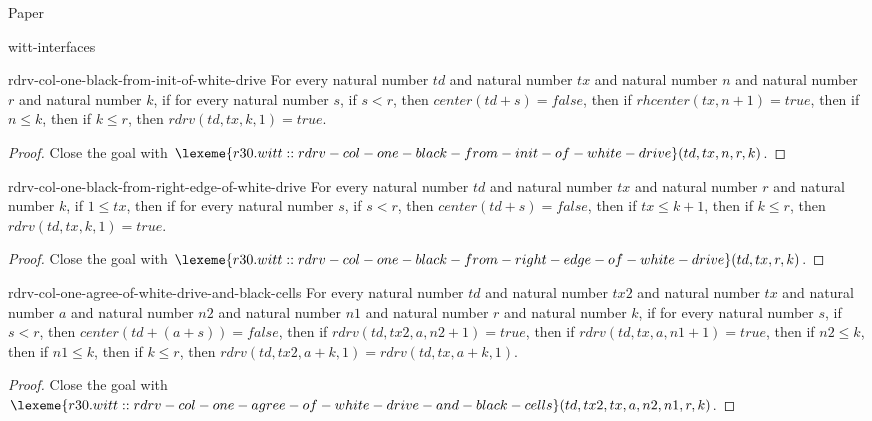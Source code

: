 \begin{lexlean}{Paper}
\begin{section}{witt-interfaces}
  \begin{theorem}{rdrv-col-one-black-from-init-of-white-drive}
  For every natural number \(td\) and natural number \(tx\) and natural number \(n\) and natural number \(r\) and natural number \(k\), if for every natural number \(s\), if \(s < r\), then \(center(td + s) = false\), then if \(rhcenter(tx, n + 1) = true\), then if \(n ≤ k\), then if \(k ≤ r\), then \(rdrv(td, tx, k, 1) = true\).
  \begin{proof}
  Close the goal with \(\lexeme{r30.witt::rdrv-col-one-black-from-init-of-white-drive}(td, tx, n, r, k)\).
  \end{proof}
  \end{theorem}

  \begin{theorem}{rdrv-col-one-black-from-right-edge-of-white-drive}
  For every natural number \(td\) and natural number \(tx\) and natural number \(r\) and natural number \(k\), if \(1 ≤ tx\), then if for every natural number \(s\), if \(s < r\), then \(center(td + s) = false\), then if \(tx ≤ k + 1\), then if \(k ≤ r\), then \(rdrv(td, tx, k, 1) = true\).
  \begin{proof}
  Close the goal with \(\lexeme{r30.witt::rdrv-col-one-black-from-right-edge-of-white-drive}(td, tx, r, k)\).
  \end{proof}
  \end{theorem}

  \begin{theorem}{rdrv-col-one-agree-of-white-drive-and-black-cells}
  For every natural number \(td\) and natural number \(tx2\) and natural number \(tx\) and natural number \(a\) and natural number \(n2\) and natural number \(n1\) and natural number \(r\) and natural number \(k\), if for every natural number \(s\), if \(s < r\), then \(center(td + (a + s)) = false\), then if \(rdrv(td, tx2, a, n2 + 1) = true\), then if \(rdrv(td, tx, a, n1 + 1) = true\), then if \(n2 ≤ k\), then if \(n1 ≤ k\), then if \(k ≤ r\), then \(rdrv(td, tx2, a + k, 1) = rdrv(td, tx, a + k, 1)\).
  \begin{proof}
  Close the goal with \(\lexeme{r30.witt::rdrv-col-one-agree-of-white-drive-and-black-cells}(td, tx2, tx, a, n2, n1, r, k)\).
  \end{proof}
  \end{theorem}


\end{section}
\end{lexlean}
